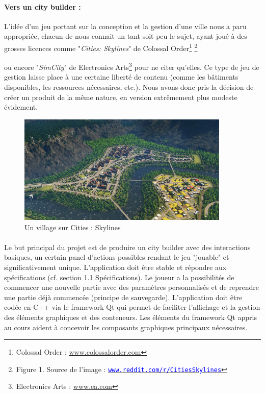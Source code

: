 \documentclass[a4paper,10pt,openany,oneside]{report}
\newcommand\blfootnote[1]{%
  \begingroup
  \renewcommand\thefootnote{}\footnote{#1}%
  \addtocounter{footnote}{-1}%
  \endgroup
}
\begin{document}
\paragraph{Vers un city builder :}
L'idée d'un jeu portant sur la conception et la gestion d'une ville nous a paru appropriée, chacun de nous connait un tant soit peu le sujet, ayant joué à des grosses licences comme "\textit{Cities: Skylines}" de Colossal Order\footnote{Colossal Order : \textcolor{blue}{\url{www.colossalorder.com}}}
\blfootnote{\hspace{7pt}Figure 1. Source de l'image : \href{https://www.reddit.com/r/CitiesSkylines/comments/3mubt5/finally_my_first_city_in_more_then_80_hours_i/}{\texttt{\textcolor{blue}{www.reddit.com/r/CitiesSkylines}}}}
 ou encore "\textit{SimCity}" de Electronics Arts\footnote{Electronics Arts : \textcolor{blue}{\url{www.ea.com}}} pour ne citer qu'elles. Ce type de jeu de gestion laisse place à une certaine liberté de contenu (comme les bâtiments disponibles, les ressources nécessaires, etc.). Nous avons donc pris la décision de créer un produit de la même nature, en version extrêmement plus modeste évidement.
\begin{center}
	\begin{figure}[h]
	\centering
	\includegraphics[width=0.9\textwidth]{img/img_intro_cscity.jpg}
	\caption{\label{fig:Cities: Skylines city}Un village sur Cities : Skylines}
	\end{figure}
\end{center}

\thispagestyle{empty}
\paragraph{}
Le but principal du projet est de produire un city builder avec des interactions basiques, un certain panel d'actions possibles rendant le jeu "jouable" et significativement unique. L'application doit être stable et répondre aux spécifications (cf. section 1.1 Spécifications). Le joueur a la possibilités de commencer une nouvelle partie avec des paramètres personnalisés et de reprendre une partie déjà commencée (principe de sauvegarde). L'application doit être codée en C++ via le framework Qt qui permet de faciliter l'affichage et la gestion des éléments graphiques et des conteneurs. Les éléments du framework Qt appris au cours aident à concevoir les composants graphiques principaux nécessaires.
\end{document}
